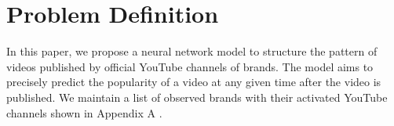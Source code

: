 \section{Problem Definition}

In this paper, we propose a neural network model to structure the pattern of videos published by official YouTube channels of brands. The model aims to precisely predict the popularity of a video at any given time after the video is published. We maintain a list of observed brands with their activated YouTube channels shown in Appendix A \cite{comparably_2021}.